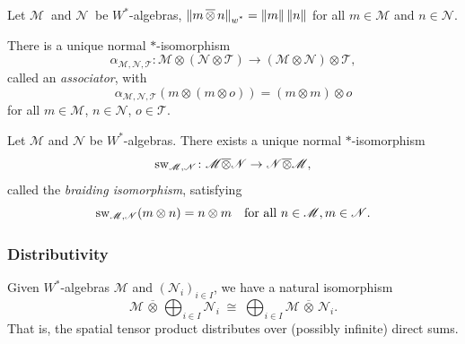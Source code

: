 \begin{proposition} \cite[Exercise 116 III]{westerbaanCategoryNeumannAlgebras2019} \label{prop:norm_tensor_w_mult}
   Let \( \mathscr{M}\ \) and \( \mathscr{N}\ \) be \( W^* \)-algebras, $\left\lVert m\,\overline{\otimes} \, n \right\rVert_{\text{$w^*$}}= \left\lVert m \right\rVert\left\lVert n \right\rVert$ for all $m \in \mathscr{M}$ and  $n \in \mathscr{N}$.
\end{proposition}

\begin{proposition} \cite[Corollary 119 IV]{westerbaanCategoryNeumannAlgebras2019} 
  \label{prop:assoc_nmiu}
   There is a unique normal $\ast$-isomorphism
\[
\alpha_{\mathscr{M},\mathscr{N},\mathscr{T}} : \mathscr{M} \otimes (\mathscr{N} \otimes \mathscr{T}) \longrightarrow (\mathscr{M} \otimes \mathscr{N} ) \otimes \mathscr{T},
\]
called an \emph{associator}, with
\[
\alpha_{\mathscr{M},\mathscr{N},\mathscr{T}}(m \otimes (m \otimes o)) = (m \otimes m) \otimes o
\]
for all \( m \in \mathscr{M} \), \( n \in \mathscr{N} \), \( o \in \mathscr{T} \).
\end{proposition}


\begin{proposition} \cite[Exercise 119 IVc]{westerbaanCategoryNeumannAlgebras2019} \label{prop:swap_nmiu}
  Let $\mathscr{M}$ and $\mathscr{N}$ be $W^*$-algebras.
There exists a unique normal $\ast$-isomorphism
\[
    \mathrm{sw}_{\mathscr{M},\mathscr{N}} \colon \mathscr{M} \overline{\otimes} \mathscr{N} \to \mathscr{N} \overline{\otimes} \mathscr{M},
    \]
    called the \emph{braiding isomorphism}, satisfying
    \[
    \mathrm{sw}_{\mathscr{M},\mathscr{N}}(m \otimes n) = n \otimes m \quad \text{for all } n \in \mathscr{M}, m \in \mathscr{N}.
    \]
\end{proposition}


\subsubsection{Distributivity}

\begin{proposition}\cite[Proposition 117 III] {westerbaanCategoryNeumannAlgebras2019} \label{prop:w*_product_disct_tensor}
  Given $W^*$-algebras \( \mathscr{M} \) and \( (\mathscr{N}_i)_{i \in I} \), we have a natural isomorphism
\[
\mathscr{M}  \,\overline{\otimes}\, \bigoplus_{i \in I} \mathscr{N}_i \;\cong\; \bigoplus_{i \in I} \mathscr{M}  \,\overline{\otimes}\, \mathscr{N}_i.
\]
That is, the spatial tensor product distributes over (possibly infinite) direct sums.
\end{proposition}

